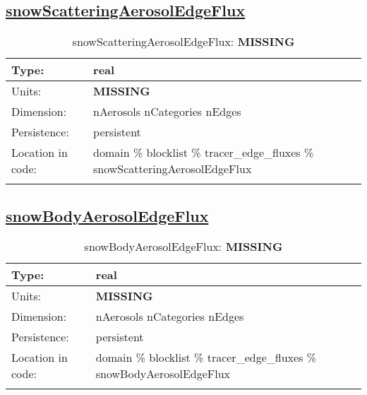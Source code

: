 \subsection[snowScatteringAerosolEdgeFlux]{\hyperref[sec:var_tab_tracer_edge_fluxes]{snowScatteringAerosolEdgeFlux}}
\label{subsec:var_sec_tracer_edge_fluxes_snowScatteringAerosolEdgeFlux}
\begin{center}
\begin{longtable}{| p{2.0in} | p{4.0in} |}
        \hline 
        Type: & real \\
        \hline 
        Units: & {\bf \color{red} MISSING} \\
        \hline 
        Dimension: & nAerosols nCategories nEdges \\
        \hline 
        Persistence: & persistent \\
        \hline 
         Location in code: & domain \% blocklist \% tracer\_edge\_fluxes \% snowScatteringAerosolEdgeFlux \\
         \hline 
    \caption{snowScatteringAerosolEdgeFlux: {\bf \color{red} MISSING}}
\end{longtable}
\end{center}
\subsection[snowBodyAerosolEdgeFlux]{\hyperref[sec:var_tab_tracer_edge_fluxes]{snowBodyAerosolEdgeFlux}}
\label{subsec:var_sec_tracer_edge_fluxes_snowBodyAerosolEdgeFlux}
\begin{center}
\begin{longtable}{| p{2.0in} | p{4.0in} |}
        \hline 
        Type: & real \\
        \hline 
        Units: & {\bf \color{red} MISSING} \\
        \hline 
        Dimension: & nAerosols nCategories nEdges \\
        \hline 
        Persistence: & persistent \\
        \hline 
         Location in code: & domain \% blocklist \% tracer\_edge\_fluxes \% snowBodyAerosolEdgeFlux \\
         \hline 
    \caption{snowBodyAerosolEdgeFlux: {\bf \color{red} MISSING}}
\end{longtable}
\end{center}
